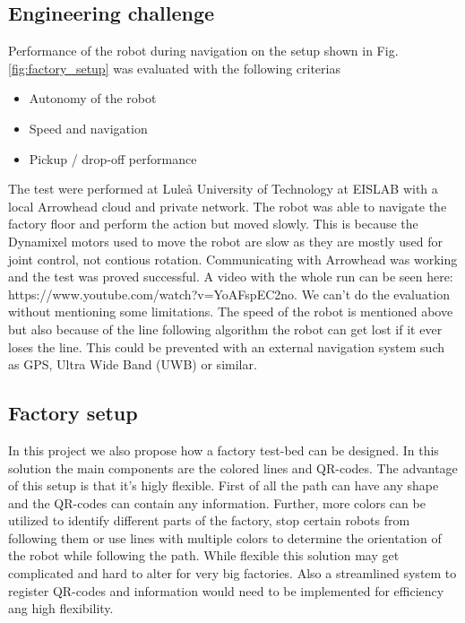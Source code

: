 \subsection{Engineering challenge}
Performance of the robot during navigation on the setup shown in Fig. \ref{fig:factory_setup} was evaluated with the following criterias

\begin{itemize}
    \item Autonomy of the robot
    \item Speed and navigation
    \item Pickup / drop-off performance
\end{itemize}

The test were performed at Luleå University of Technology at EISLAB with a local Arrowhead cloud and private network. The robot was able to navigate the factory floor and perform the action but moved slowly. This is because the Dynamixel motors used to move the robot are slow as they are mostly used for joint control, not contious rotation. Communicating with Arrowhead was working and the test was proved successful. A video with the whole run can be seen here: https://www.youtube.com/watch?v=YoAFspEC2no. 
We can't do the evaluation without mentioning some limitations. The speed of the robot is mentioned above but also because of the line following algorithm the robot can get lost if it ever loses the line. This could be prevented with an external navigation system such as GPS, Ultra Wide Band (UWB) or similar. 

\subsection{Factory setup}
In this project we also propose how a factory test-bed can be designed. In this solution the main components are the colored lines and QR-codes. The advantage of this setup is that it's higly flexible. First of all the path can have any shape and the QR-codes can contain any information. Further, more colors can be utilized to identify different parts of the factory, stop certain robots from following them or use lines with multiple colors to determine the orientation of the robot while following the path. While flexible this solution may get complicated and hard to alter for very big factories. Also a streamlined system to register QR-codes and information would need to be implemented for efficiency ang high flexibility. 
